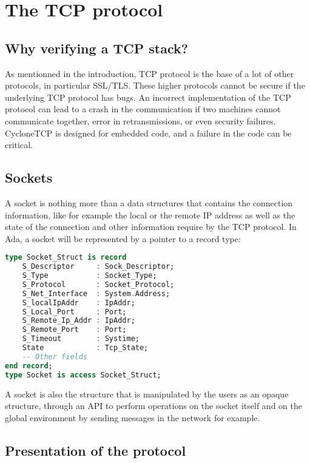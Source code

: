 \documentclass[a4paper, 10pt]{article}
\begin{document}
    \section{The TCP protocol}

    \subsection{Why verifying a TCP stack?}

    As mentionned in the introduction, TCP protocol is the base of a lot of other protocols,
    in particular SSL/TLS. These higher protocols cannot be secure if the underlying TCP protocol
    has bugs. An incorrect implementation of the TCP protocol can lead to a crash
    in the communication if two machines cannot communicate together, error in
    retransmissions, or even security failures. CycloneTCP is designed for embedded
    code, and a failure in the code can be critical.


    \subsection{Sockets}

    A socket is nothing more than a data structures that contains the connection
    information, like for example the local or the remote IP address as well as
    the state of the connection and other information require by the TCP protocol.
    In Ada, a socket will be represented by a pointer to a record type:

    \begin{lstlisting}[language=Ada]
type Socket_Struct is record
    S_Descriptor     : Sock_Descriptor;
    S_Type           : Socket_Type;
    S_Protocol       : Socket_Protocol;
    S_Net_Interface  : System.Address;
    S_localIpAddr    : IpAddr;
    S_Local_Port     : Port;
    S_Remote_Ip_Addr : IpAddr;
    S_Remote_Port    : Port;
    S_Timeout        : Systime;
    State            : Tcp_State;
    -- Other fields
end record;
type Socket is access Socket_Struct;
    \end{lstlisting}

    A socket is also the structure that is manipulated by the users as an opaque structure,
    through an API to perform operations on the socket itself and on the
    global environment by sending messages in the network for example.

    \subsection{Presentation of the protocol}
\end{document}
